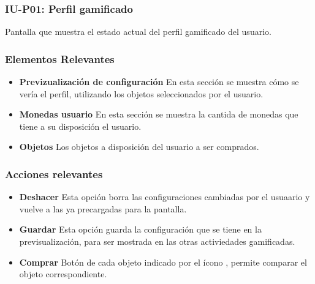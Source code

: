 
\subsubsection{IU-P01: Perfil gamificado}

 Pantalla que muestra el estado actual del perfil gamificado del usuario.



\subsubsection{Elementos Relevantes}

    \begin{itemize}
        \item {\bf Previzualización de configuración}
            En esta sección se muestra cómo se vería el perfil, utilizando los objetos seleccionados por el usuario.
        \item {\bf Monedas usuario}
            En esta sección se muestra la cantida de monedas que tiene a su disposición el usuario.
        \item {\bf Objetos}
            Los objetos a disposición del usuario a ser comprados.
    \end{itemize}

\subsubsection{Acciones relevantes}

    \begin{itemize}
        \item {\bf Deshacer}
            Esta opción borra las configuraciones cambiadas por el usuaario y vuelve a las ya precargadas para la pantalla.
        \item {\bf Guardar}
            Esta opción guarda la configuración que se tiene en la previsualización, para ser  mostrada en las otras activiedades gamificadas.
        \item {\bf Comprar}
            Botón de cada objeto indicado por el ícono \IUMonedas{}, permite comparar el objeto correspondiente.
    \end{itemize}

\clearpage
